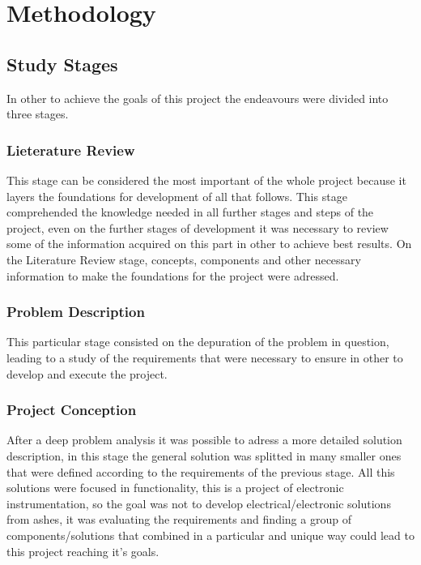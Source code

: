 \chapter{Methodology}

	\section{Study Stages}
		In other to achieve the goals of this project the endeavours were divided into three stages.

	\subsection{Lieterature Review}
		This stage can be considered the most important of the whole project because it layers the foundations for development of all that follows. This stage comprehended the knowledge needed in all further stages and steps of the project, even on the further stages of development it was necessary to review some of the information acquired on this part in other to achieve best results. On the Literature Review stage, concepts, components and other necessary information to make the foundations for the project were adressed.

	\subsection{Problem Description}
		This particular stage consisted on the depuration of the problem in question, leading to a study of the requirements that were necessary to ensure in other to develop and execute the project. 

	\subsection{Project Conception}
		After a deep problem analysis it was possible to adress a more detailed solution description, in this stage the general solution was splitted in many smaller ones that were defined according to the requirements of the previous stage. All this solutions were focused in functionality, this is a project of electronic instrumentation, so the goal was not to develop electrical/electronic solutions from ashes, it was evaluating the requirements and finding a group of components/solutions that combined in a particular and unique way could lead to this project reaching it's goals.